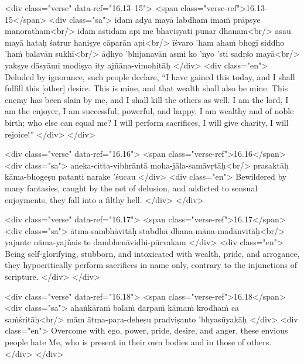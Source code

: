 \begin{html}
<div class="verse" data-ref="16.13–15">
  <span class="verse-ref">16.13–15</span>
  <div class="sa">
    idam adya mayā labdham imaṁ prāpsye manoratham<br/>
    idam astīdam api me bhaviṣyati punar dhanam<br/>
    asau mayā hataḥ śatrur haniṣye cāparān api<br/>
    īśvaro ’ham ahaṁ bhogī siddho ’haṁ balavān sukhī<br/>
    āḍhyo ’bhijanavān asmi ko ’nyo ’sti sadṛśo mayā<br/>
    yakṣye dāsyāmi modiṣya ity ajñāna-vimohitāḥ
  </div>
  <div class="en">
    Deluded by ignorance, such people declare, \enquote{I have gained this today, and I shall fulfill this [other] desire. This is mine, and that wealth shall also be mine. This enemy has been slain by me, and I shall kill the others as well. I am the lord, I am the enjoyer, I am successful, powerful, and happy. I am wealthy and of noble birth; who else can equal me? I will perform sacrifices, I will give charity, I will rejoice!}
  </div>
</div>
\end{html}



\begin{html}
<div class="verse" data-ref="16.16">
  <span class="verse-ref">16.16</span>
  <div class="sa">
    aneka-citta-vibhrāntā moha-jāla-samāvṛtāḥ<br/>
    prasaktāḥ kāma-bhogeṣu patanti narake ’śucau
  </div>
  <div class="en">
    Bewildered by many fantasies, caught by the net of delusion, and addicted to sensual enjoyments, they fall into a filthy hell.
  </div>
</div>
\end{html}



\begin{html}
<div class="verse" data-ref="16.17">
  <span class="verse-ref">16.17</span>
  <div class="sa">
    ātma-sambhāvitāḥ stabdhā dhana-māna-madānvitāḥ<br/>
    yajante nāma-yajñais te dambhenāvidhi-pūrvakam
  </div>
  <div class="en">
    Being self-glorifying, stubborn, and intoxicated with wealth, pride, and arrogance, they hypocritically perform sacrifices in name only, contrary to the injunctions of scripture.
  </div>
</div>
\end{html}



\begin{html}
<div class="verse" data-ref="16.18">
  <span class="verse-ref">16.18</span>
  <div class="sa">
    ahaṅkāraṁ balaṁ darpaṁ kāmaṁ krodhaṁ ca saṁśritāḥ<br/>
    mām ātma-para-deheṣu pradviṣanto ’bhyasūyakāḥ
  </div>
  <div class="en">
    Overcome with ego, power, pride, desire, and anger, these envious people hate Me, who is present in their own bodies and in those of others.
  </div>
</div>
\end{html}



